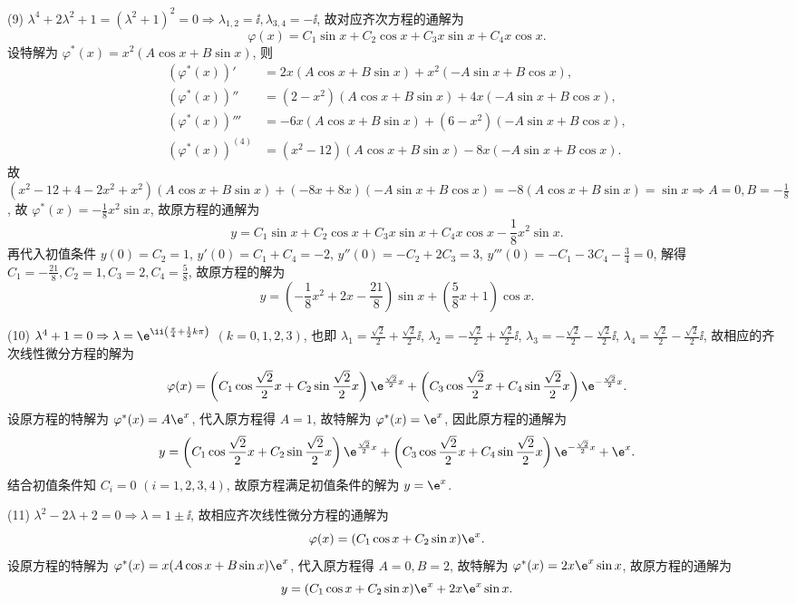 \begin{solve}
  (9) $\lambda^4+2\lambda^2+1=(\lambda^2+1)^2=0\Rightarrow\lambda_{1,2}=\ii,\lambda_{3,4}=-\ii$,
  故对应齐次方程的通解为
  \[\varphi(x)=C_1\sin x+C_2\cos x+C_3x\sin x+C_4x\cos x.\]
  设特解为 $\varphi^*(x)=x^2(A\cos x+B\sin x)$, 则
  \[\begin{split}
    \left(\varphi^*(x)\right)'&=2x(A\cos x+B\sin x)+x^2(-A\sin x+B\cos x), \\
    \left(\varphi^*(x)\right)''&=(2-x^2)(A\cos x+B\sin x)+4x(-A\sin x+B\cos x), \\
    \left(\varphi^*(x)\right)'''&=-6x(A\cos x+B\sin x)+(6-x^2)(-A\sin x+B\cos x), \\
    \left(\varphi^*(x)\right)^{(4)}&=(x^2-12)(A\cos x+B\sin x)-8x(-A\sin x+B\cos x).
  \end{split}\]
  故 $(x^2-12+4-2x^2+x^2)(A\cos x+B\sin x)+(-8x+8x)(-A\sin x+B\cos x)=-8(A\cos x+B\sin x)=\sin x\Rightarrow A=0,B=-\frac{1}{8}$, 
  故 $\varphi^*(x)=-\frac{1}{8}x^2\sin x$, 故原方程的通解为
  \[y=C_1\sin x+C_2\cos x+C_3x\sin x+C_4x\cos x-\frac{1}{8}x^2\sin x.\]
  再代入初值条件 $y(0)=C_2=1$, $y'(0)=C_1+C_4=-2$, $y''(0)=-C_2+2C_3=3$, 
  $y'''(0)=-C_1-3C_4-\frac{3}{4}=0$, 
  解得 $C_1=-\frac{21}{8},C_2=1,C_3=2,C_4=\frac{5}{8}$, 故原方程的解为
  \[y=\left(-\frac{1}{8}x^2+2x-\frac{21}{8}\right)\sin x+\left(\frac{5}{8}x+1\right)\cos x.\]

  (10) $\lambda^4+1=0\Rightarrow\lambda=\e^{\ii\left(\frac{\pi}{4}+\frac{1}{2}k\pi\right)}$ 
  $(k=0,1,2,3)$, 
  也即 
  $\lambda_1=\frac{\sqrt{2}}{2}+\frac{\sqrt{2}}{2}\ii$,
  $\lambda_2=-\frac{\sqrt{2}}{2}+\frac{\sqrt{2}}{2}\ii$,
  $\lambda_3=-\frac{\sqrt{2}}{2}-\frac{\sqrt{2}}{2}\ii$,
  $\lambda_4=\frac{\sqrt{2}}{2}-\frac{\sqrt{2}}{2}\ii$, 
  故相应的齐次线性微分方程的解为
  \[\varphi(x) = 
  \left(C_1\cos\frac{\sqrt{2}}{2}x+C_2\sin\frac{\sqrt{2}}{2}x\right)\e^{\frac{\sqrt{2}}{2}x}
  + \left(C_3\cos\frac{\sqrt{2}}{2}x+C_4\sin\frac{\sqrt{2}}{2}x\right)\e^{-\frac{\sqrt{2}}{2}x}.\]
  设原方程的特解为 $\varphi^*(x)=A\e^x$, 代入原方程得 $A=1$, 故特解为 $\varphi^*(x)=\e^x$, 因此原方程的通解为
  \[y = \left(C_1\cos\frac{\sqrt{2}}{2}x+C_2\sin\frac{\sqrt{2}}{2}x\right)\e^{\frac{\sqrt{2}}{2}x}
  + \left(C_3\cos\frac{\sqrt{2}}{2}x+C_4\sin\frac{\sqrt{2}}{2}x\right)\e^{-\frac{\sqrt{2}}{2}x}+\e^x.\]
  结合初值条件知 $C_i=0$ $(i=1,2,3,4)$, 故原方程满足初值条件的解为 $y=\e^x$.

  (11) $\lambda^2-2\lambda+2=0\Rightarrow\lambda=1\pm\ii$, 故相应齐次线性微分方程的通解为
  \[\varphi(x)=(C_1\cos x+C_2\sin x)\e^x.\]
  设原方程的特解为 $\varphi^*(x)=x(A\cos x+B\sin x)\e^x$, 代入原方程得 $A=0,B=2$, 
  故特解为 $\varphi^*(x)=2x\e^x\sin x$, 故原方程的通解为
  \[y=(C_1\cos x+C_2\sin x)\e^x+2x\e^x\sin x.\]


\end{solve}

